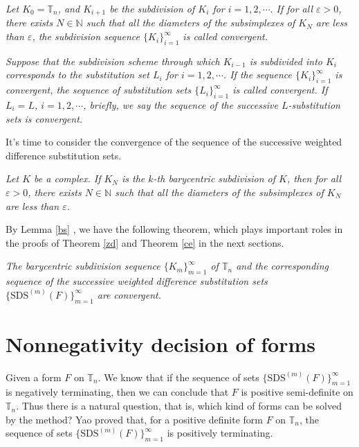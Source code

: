 \documentclass [10pt,a4paper]{article}
\begin{document}
\begin{definition}\label{sld0}
\emph{ Let $K_0=\mathbb{T}_n$, and $K_{i+1}$ be the subdivision of
$K_{i}$ for $i=1,2,\cdots.$  If for all $ \varepsilon>0$, there
exists $N\in \mathbb{N}$ such that all the diameters of the
subsimplexes
 of $K_N$ are less than $\varepsilon$, the subdivision sequence
$\{K_i\}_{i=1}^\infty$ is called convergent.}
\end{definition}

\begin{definition}\label{sld5}
\emph{Suppose that the subdivision scheme through which $K_{i-1}$ is
subdivided into $K_{i}$ corresponds to the substitution set $L_{i}$
for
 $i=1,2,\cdots$. If the sequence $\{K_i\}_{i=1}^\infty$ is convergent, the
 sequence of substitution sets
$\{L_i\}_{i=1}^\infty$ is called convergent. If $L_{i}=L$,
$i=1,2,\cdots$, brief\mbox{}ly, we say the sequence of the
successive $L$-substitution sets is convergent.}
\end{definition}
It's time to consider  the convergence of the sequence of the
successive weighted dif\mbox{}ference substitution sets.
\begin{lemma}\label{bs}
\emph{\cite{Edwin:1, James:1} Let $K$ be a complex. If $K_N$ is the
$k$-th barycentric subdivision of $K$, then for all $\varepsilon>0$,
there exists $N\in \mathbb{N}$ such that all the diameters of the
subsimplexes
 of $K_N$ are less than $\varepsilon$. }
\end{lemma}

 By Lemma \ref{bs} , we have the following theorem,  which plays important
 roles
 in the proofs of Theorem \ref{zd} and Theorem \ref{ce} in the next sections.

\begin{theorem}
\emph{The   barycentric subdivision
 sequence $\{K_m\}_{m=1}^\infty$ of $ \mathbb{T}_n$ and the corresponding sequence of
the successive weighted dif\mbox{}ference substitution sets
$\{\textrm{SDS}^{(m)}(F)\}_{m=1}^\infty$
 are convergent.} \label{sl}
\end{theorem}




\section{Nonnegativity decision of forms }
Given a form $F$ on $\mathbb{T}_n$. We know that if the sequence of
sets $\{\textrm{SDS}^{(m)}(F)\}_{m=1}^\infty$ is negatively
terminating, then we can conclude that $F$  is positive
semi-definite on $\mathbb{T}_n$. Thus there is a natural question,
that is, which kind of forms can be solved by the method? Yao
\cite{Yong:1} proved that, for a positive definite form $F$ on
$\mathbb{T}_n$, the sequence of sets
$\{\textrm{SDS}^{(m)}(F)\}_{m=1}^\infty$ is positively terminating.
\end{document}

